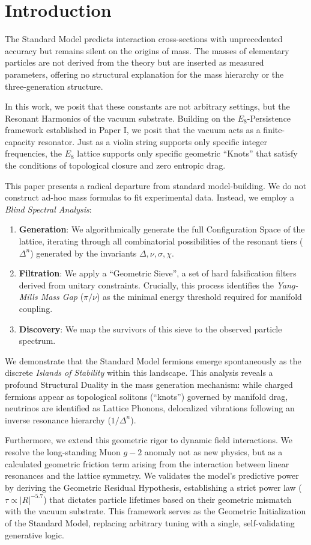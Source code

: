 \section{Introduction}
The Standard Model predicts interaction cross-sections with unprecedented accuracy but remains silent on the origins of mass. The masses of elementary particles are not derived from the theory but are inserted as measured parameters, offering no structural explanation for the mass hierarchy or the three-generation structure.

In this work, we posit that these constants are not arbitrary settings, but the Resonant Harmonics of the vacuum substrate. Building on the $E_8$-Persistence framework established in Paper I, we posit that the vacuum acts as a finite-capacity resonator. Just as a violin string supports only specific integer frequencies, the $E_8$ lattice supports only specific geometric ``Knots'' that satisfy the conditions of topological closure and zero entropic drag.

This paper presents a radical departure from standard model-building. We do not construct ad-hoc mass formulas to fit experimental data. Instead, we employ a \textit{Blind Spectral Analysis}:

\begin{enumerate}
\item \textbf{Generation}: We algorithmically generate the full Configuration Space of the lattice, iterating through all combinatorial possibilities of the resonant tiers ($\Delta^n$) generated by the invariants ${ \Delta, \nu, \sigma, \chi }$.  
\item \textbf{Filtration}: We apply a ``Geometric Sieve'', a set of hard falsification filters derived from unitary constraints. Crucially, this process identifies the \textit{Yang-Mills Mass Gap} ($\pi/\nu$) as the minimal energy threshold required for manifold coupling.  
\item \textbf{Discovery}: We map the survivors of this sieve to the observed particle spectrum.
\end{enumerate}

We demonstrate that the Standard Model fermions emerge spontaneously as the discrete \textit{Islands of Stability} within this landscape. This analysis reveals a profound Structural Duality in the mass generation mechanism: while charged fermions appear as topological solitons (``knots'') governed by manifold drag, neutrinos are identified as Lattice Phonons, delocalized vibrations following an inverse resonance hierarchy ($1/\Delta^n$).

Furthermore, we extend this geometric rigor to dynamic field interactions. We resolve the long-standing Muon $g-2$ anomaly not as new physics, but as a calculated geometric friction term arising from the interaction between linear resonances and the lattice symmetry. We validates the model's predictive power by deriving the Geometric Residual Hypothesis, establishing a strict power law ($\tau \propto |R|^{-5.7}$) that dictates particle lifetimes based on their geometric mismatch with the vacuum substrate. This framework serves as the Geometric Initialization of the Standard Model, replacing arbitrary tuning with a single, self-validating generative logic.